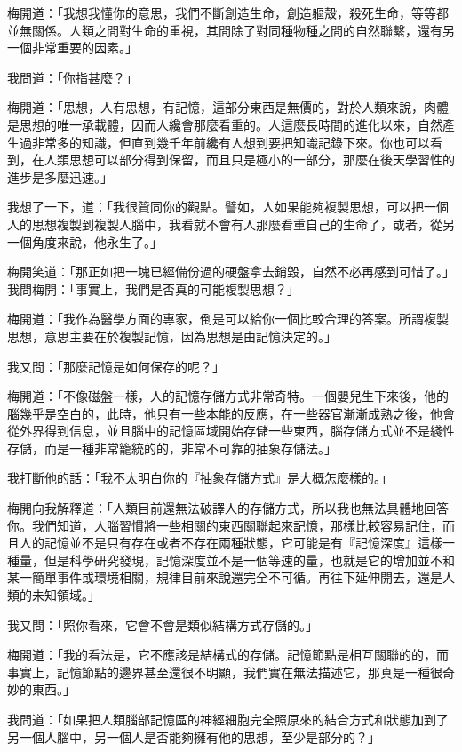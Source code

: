 梅開道：「我想我懂你的意思，我們不斷創造生命，創造軀殼，殺死生命，等等都並無關係。人類之間對生命的重視，其間除了對同種物種之間的自然聯繫，還有另一個非常重要的因素。」

我問道：「你指甚麼？」

梅開道：「思想，人有思想，有記憶，這部分東西是無價的，對於人類來說，肉體是思想的唯一承載體，因而人纔會那麼看重的。人這麼長時間的進化以來，自然產生過非常多的知識，但直到幾千年前纔有人想到要把知識記錄下來。你也可以看到，在人類思想可以部分得到保留，而且只是極小的一部分，那麼在後天學習性的進步是多麼迅速。」

我想了一下，道：「我很贊同你的觀點。譬如，人如果能夠複製思想，可以把一個人的思想複製到複製人腦中，我看就不會有人那麼看重自己的生命了，或者，從另一個角度來說，他永生了。」

梅開笑道：「那正如把一塊已經備份過的硬盤拿去銷毀，自然不必再感到可惜了。」
\\


我問梅開：「事實上，我們是否真的可能複製思想？」

梅開道：「我作為醫學方面的專家，倒是可以給你一個比較合理的答案。所謂複製思想，意思主要在於複製記憶，因為思想是由記憶決定的。」

我又問：「那麼記憶是如何保存的呢？」

梅開道：「不像磁盤一樣，人的記憶存儲方式非常奇特。一個嬰兒生下來後，他的腦幾乎是空白的，此時，他只有一些本能的反應，在一些器官漸漸成熟之後，他會從外界得到信息，並且腦中的記憶區域開始存儲一些東西，腦存儲方式並不是綫性存儲，而是一種非常籠統的的，非常不可靠的抽象存儲法。」

我打斷他的話：「我不太明白你的『抽象存儲方式』是大概怎麼樣的。」

梅開向我解釋道：「人類目前還無法破譯人的存儲方式，所以我也無法具體地回答你。我們知道，人腦習慣將一些相關的東西關聯起來記憶，那樣比較容易記住，而且人的記憶並不是只有存在或者不存在兩種狀態，它可能是有『記憶深度』這樣一種量，但是科學研究發現，記憶深度並不是一個等速的量，也就是它的增加並不和某一簡單事件或環境相關，規律目前來說還完全不可循。再往下延伸開去，還是人類的未知領域。」

我又問：「照你看來，它會不會是類似結構方式存儲的。」

梅開道：「我的看法是，它不應該是結構式的存儲。記憶節點是相互關聯的的，而事實上，記憶節點的邊界甚至還很不明顯，我們實在無法描述它，那真是一種很奇妙的東西。」

我問道：「如果把人類腦部記憶區的神經細胞完全照原來的結合方式和狀態加到了另一個人腦中，另一個人是否能夠擁有他的思想，至少是部分的？」

